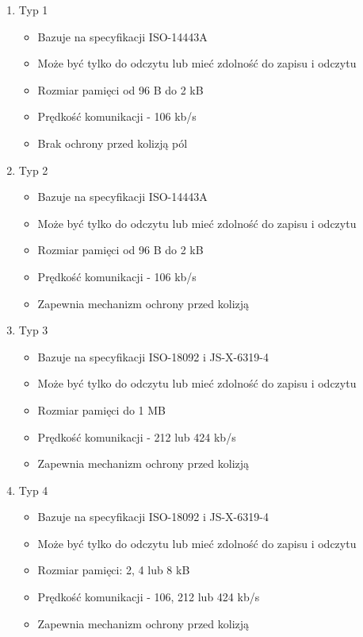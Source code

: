 \begin{enumerate}
	\item Typ 1
	\begin{itemize}
		\item Bazuje na specyfikacji ISO-14443A
		\item Może być tylko do odczytu lub mieć zdolność do zapisu i odczytu
		\item Rozmiar pamięci od 96 B do 2 kB
		\item Prędkość komunikacji - 106 kb/s
		\item Brak ochrony przed kolizją pól
	\end{itemize}
	
	\item Typ 2
	\begin{itemize}
		\item Bazuje na specyfikacji ISO-14443A
		\item Może być tylko do odczytu lub mieć zdolność do zapisu i odczytu
		\item Rozmiar pamięci od 96 B do 2 kB
		\item Prędkość komunikacji - 106 kb/s
		\item Zapewnia mechanizm ochrony przed kolizją
	\end{itemize}
	
	\item Typ 3
	\begin{itemize}
		\item Bazuje na specyfikacji ISO-18092 i JS-X-6319-4
		\item Może być tylko do odczytu lub mieć zdolność do zapisu i odczytu
		\item Rozmiar pamięci do 1 MB
		\item Prędkość komunikacji - 212 lub 424 kb/s
		\item Zapewnia mechanizm ochrony przed kolizją
	\end{itemize}
	
	\item Typ 4
	\begin{itemize}
		\item Bazuje na specyfikacji ISO-18092 i JS-X-6319-4
		\item Może być tylko do odczytu lub mieć zdolność do zapisu i odczytu
		\item Rozmiar pamięci: 2, 4 lub 8 kB
		\item Prędkość komunikacji - 106, 212 lub 424 kb/s
		\item Zapewnia mechanizm ochrony przed kolizją
	\end{itemize}
	
\end{enumerate}



